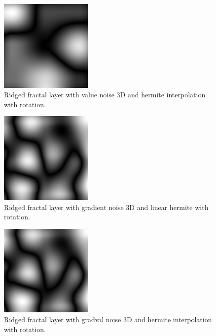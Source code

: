 \begin{figure}[h]
\centering
\includegraphics[width=0.4\textwidth]{out/simpleRidgedLayer3/simpleRidgedLayer3_value_noise3D_hermiteInterp_rot.png}
\caption{Ridged fractal layer with value noise 3D and hermite interpolation with rotation.}
\label{fig:ridged_fractal_layer3_value_noise3D_hermiteInterp_rot}
\end{figure}

\begin{figure}[h]
\centering
\includegraphics[width=0.4\textwidth]{out/simpleRidgedLayer3/simpleRidgedLayer3_gradient_noise3D_hermiteInterp_rot.png}
\caption{Ridged fractal layer with gradient noise 3D and linear hermite with rotation.}
\label{fig:ridged_fractal_layer3_gradient_noise3D_hermiteInterp_rot}
\end{figure}

\begin{figure}[h]
\centering
\includegraphics[width=0.4\textwidth]{out/simpleRidgedLayer3/simpleRidgedLayer3_gradval_noise3D_hermiteInterp_rot.png}
\caption{Ridged fractal layer with gradval noise 3D and hermite interpolation with rotation.}
\label{fig:ridged_fractal_layer3_gradval_noise3D_hermiteInterp_rot}
\end{figure}

